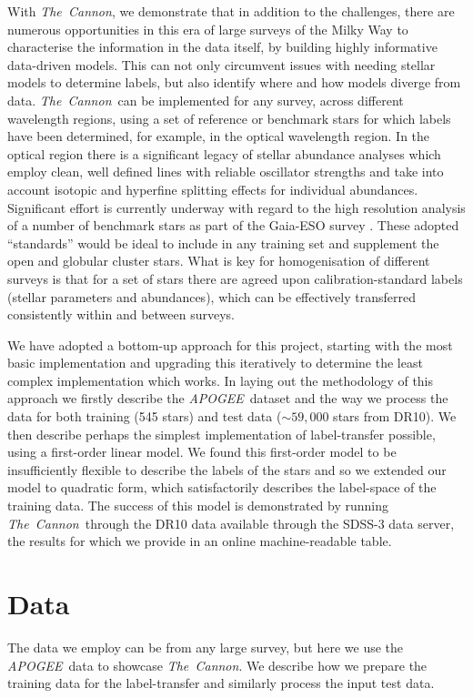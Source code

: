 \documentclass[12pt, preprint]{aastex}
\newcommand{\tc}{\textsl{The~Cannon}}
\newcommand{\apogee}{\textsl{APOGEE}}
\begin{document}
With \tc, we demonstrate that in addition to the challenges, there are
numerous opportunities in this era of large surveys of the Milky Way
to characterise the information in the data itself, by building highly
informative data-driven models. 
This can not only circumvent issues with needing stellar models to
determine labels, but also identify where and how models diverge from
data. 
\tc\ can be implemented for any survey, across different wavelength
regions, using a set of reference or benchmark stars for which labels
have been determined, for example, in the optical wavelength region. 
In the optical region there is a significant legacy of stellar
abundance analyses which employ clean, well defined lines with
reliable oscillator strengths and take into account isotopic and
hyperfine splitting effects for individual abundances. 
Significant effort is currently underway with regard to the high
resolution analysis of a number of benchmark stars as part of
the Gaia-ESO survey \citep[e.g.,[]{Jofre2014}. 
These adopted ``standards'' would be ideal to include in any training
set and supplement the open and globular cluster stars. 
What is key for homogenisation of different surveys is that for a set
of stars there are agreed upon calibration-standard labels (stellar
parameters and abundances), which can be effectively transferred consistently within
and between surveys.

We have adopted a bottom-up approach for this project, starting with
the most basic implementation and upgrading this iteratively to
determine the least complex implementation which works.
In laying out the methodology of this approach we firstly describe the
\apogee\ dataset and the way we process the data for both training
(545 stars) and test data ($\sim59,000$ stars from DR10).
We then describe perhaps the simplest implementation of label-transfer
possible, using a first-order linear model.
We found this first-order model to be insufficiently flexible to
describe the labels of the stars and so we extended our model to
quadratic form, which satisfactorily describes the label-space of the
training data.
The success of this model is demonstrated by running \tc\ through the
DR10 data available through the SDSS-3 data server, the results for
which we provide in an online machine-readable table.

\section{Data}

The data we employ can be from any large survey, but here we use the \apogee\ data to showcase \tc . We describe how we prepare the training data for the label-transfer and similarly process the input test data.
\end{document}
